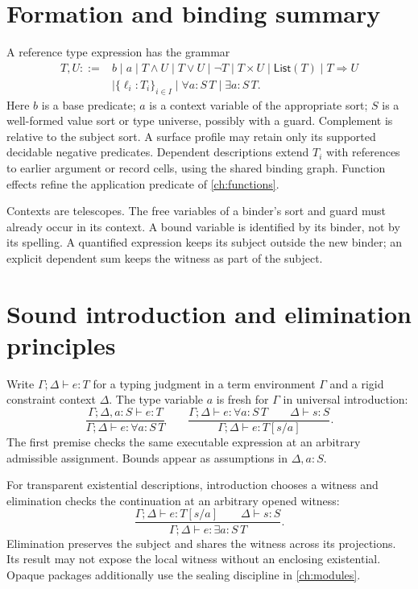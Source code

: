 \documentclass[11pt,a4paper,oneside]{report}
\newcommand{\List}{\mathsf{List}}
\theoremstyle{remark}
\begin{document}
\section{Formation and binding summary}
A reference type expression has the grammar
\[
\begin{aligned}
 T,U ::= {}& b\mid a\mid T\land U\mid T\lor U\mid\neg T
       \mid T\times U\mid\List(T)\mid T\Rightarrow U\\
       &\mid \{\ell_i:T_i\}_{i\in I}
       \mid \forall a:S\,T\mid\exists a:S\,T.
\end{aligned}
\]
Here $b$ is a base predicate; $a$ is a context variable of the appropriate sort;
$S$ is a well-formed value sort or type universe, possibly with a guard.
Complement is relative to the subject sort. A surface profile may retain only
its supported decidable negative predicates. Dependent descriptions extend $T_i$
with references to earlier argument or record cells, using the shared binding
graph. Function effects refine the application predicate of \cref{ch:functions}.

Contexts are telescopes. The free variables of a binder's sort and guard must
already occur in its context. A bound variable is identified by its binder, not
by its spelling. A quantified expression keeps its subject outside the new
binder; an explicit dependent sum keeps the witness as part of the subject.

\section{Sound introduction and elimination principles}
Write $\Gamma;\Delta\vdash e:T$ for a typing judgment in a term environment
$\Gamma$ and a rigid constraint context $\Delta$. The type variable $a$ is fresh
for $\Gamma$ in universal introduction:
\[
\frac{\Gamma;\Delta,a:S\vdash e:T}
     {\Gamma;\Delta\vdash e:\forall a:S\,T}
\qquad
\frac{\Gamma;\Delta\vdash e:\forall a:S\,T\qquad\Delta\vdash s:S}
     {\Gamma;\Delta\vdash e:T[s/a]}.
\]
The first premise checks the same executable expression at an arbitrary
admissible assignment. Bounds appear as assumptions in $\Delta,a:S$.

For transparent existential descriptions, introduction chooses a witness and
elimination checks the continuation at an arbitrary opened witness:
\[
\frac{\Gamma;\Delta\vdash e:T[s/a]\qquad\Delta\vdash s:S}
     {\Gamma;\Delta\vdash e:\exists a:S\,T}.
\]
Elimination preserves the subject and shares the witness across its projections.
Its result may not expose the local witness without an enclosing existential.
Opaque packages additionally use the sealing discipline in \cref{ch:modules}.
\end{document}

